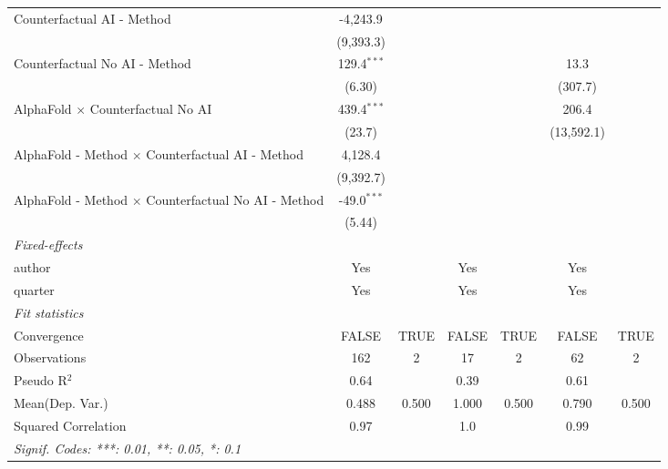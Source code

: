 \begin{tabular}{lcccccc}
   Counterfactual AI - Method                                 & -4,243.9       &      &         &      &            &   \\   
                                                              & (9,393.3)      &      &         &      &            &   \\   
   Counterfactual No AI - Method                              & 129.4$^{***}$  &      &         &      & 13.3       &   \\   
                                                              & (6.30)         &      &         &      & (307.7)    &   \\   
   AlphaFold $\times$ Counterfactual No AI                    & 439.4$^{***}$  &      &         &      & 206.4      &   \\   
                                                              & (23.7)         &      &         &      & (13,592.1) &   \\   
   AlphaFold - Method $\times$ Counterfactual AI - Method     & 4,128.4        &      &         &      &            &   \\   
                                                              & (9,392.7)      &      &         &      &            &   \\   
   AlphaFold - Method $\times$ Counterfactual No AI - Method  & -49.0$^{***}$  &      &         &      &            &   \\   
                                                              & (5.44)         &      &         &      &            &   \\   
   \midrule
   \emph{Fixed-effects}\\
   author                                                     & Yes            &      & Yes     &      & Yes        & \\  
   quarter                                                    & Yes            &      & Yes     &      & Yes        & \\  
   \midrule
   \emph{Fit statistics}\\
   Convergence                                                &FALSE           & TRUE & FALSE   & TRUE & FALSE      & TRUE\\  
   Observations                                               & 162            & 2    & 17      & 2    & 62         & 2\\  
   Pseudo R$^2$                                               & 0.64           &      & 0.39    &      & 0.61       & \\  
Mean(Dep. Var.) & 0.488 & 0.500 & 1.000 & 0.500 & 0.790 & 0.500 \\
   Squared Correlation                                        & 0.97           &      & 1.0     &      & 0.99       & \\  
   \midrule \midrule
   \multicolumn{7}{l}{\emph{Signif. Codes: ***: 0.01, **: 0.05, *: 0.1}}\\
\end{tabular}
\par\endgroup
